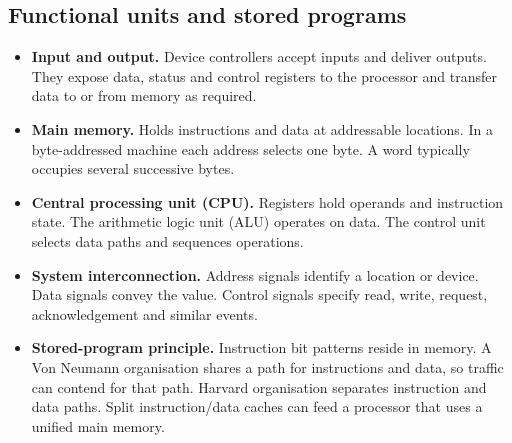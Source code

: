 \documentclass[12pt,a4paper]{article}
\begin{document}
\subsection{Functional units and stored programs}
\begin{itemize}[leftmargin=*,itemsep=3pt]
\item \textbf{Input and output.} Device controllers accept inputs and deliver outputs. They expose data, status and control registers to the processor and transfer data to or from memory as required.
\item \textbf{Main memory.} Holds instructions and data at addressable locations. In a byte-addressed machine each address selects one byte. A word typically occupies several successive bytes.
\item \textbf{Central processing unit (CPU).} Registers hold operands and instruction state. The arithmetic logic unit (ALU) operates on data. The control unit selects data paths and sequences operations.
\item \textbf{System interconnection.} Address signals identify a location or device. Data signals convey the value. Control signals specify read, write, request, acknowledgement and similar events.
\item \textbf{Stored-program principle.} Instruction bit patterns reside in memory. A Von Neumann organisation shares a path for instructions and data, so traffic can contend for that path. Harvard organisation separates instruction and data paths. Split instruction/data caches can feed a processor that uses a unified main memory.
\end{itemize}
\begin{tcolorbox}[tikzbox,title={Functional units and their interconnection},unbreakable]
\centering
{}
\end{tcolorbox}
\end{document}
